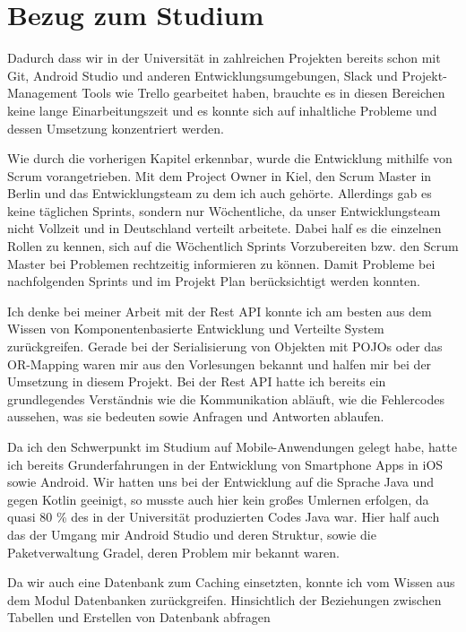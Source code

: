 \chapter{Bezug zum Studium}
Dadurch dass wir in der Universität in zahlreichen Projekten bereits schon mit Git, Android Studio und anderen Entwicklungsumgebungen, Slack und Projekt-Management Tools wie Trello gearbeitet haben, brauchte es in diesen Bereichen keine lange Einarbeitungszeit und es konnte sich auf inhaltliche Probleme und dessen Umsetzung konzentriert werden.

Wie durch die vorherigen Kapitel erkennbar, wurde die Entwicklung mithilfe von Scrum vorangetrieben. Mit dem Project Owner in Kiel, den Scrum Master in Berlin und das Entwicklungsteam zu dem ich auch gehörte. Allerdings gab es keine täglichen Sprints, sondern nur Wöchentliche, da unser Entwicklungsteam nicht Vollzeit und in Deutschland verteilt arbeitete. Dabei half es die einzelnen Rollen zu kennen, sich auf die Wöchentlich Sprints Vorzubereiten bzw. den Scrum Master bei Problemen rechtzeitig informieren zu können. Damit Probleme bei nachfolgenden Sprints und im Projekt Plan berücksichtigt werden konnten.  %


Ich denke bei meiner Arbeit mit der Rest API konnte ich am besten aus dem Wissen von Komponentenbasierte Entwicklung und Verteilte System zurückgreifen. Gerade bei der Serialisierung von Objekten mit POJOs oder das OR-Mapping waren mir aus den Vorlesungen bekannt und halfen mir bei der Umsetzung in diesem Projekt. Bei der Rest API hatte ich bereits ein grundlegendes Verständnis wie die Kommunikation abläuft, wie die Fehlercodes aussehen, was sie bedeuten sowie Anfragen und Antworten ablaufen.

Da ich den Schwerpunkt im Studium  auf Mobile-Anwendungen gelegt habe, hatte ich bereits Grunderfahrungen in der Entwicklung von Smartphone Apps in iOS sowie  Android. Wir hatten uns bei der Entwicklung auf die Sprache Java und gegen Kotlin geeinigt, so musste auch hier kein großes Umlernen erfolgen, da quasi 80 \% des in der Universität produzierten Codes Java war. Hier half auch das der Umgang mir Android Studio und deren Struktur, sowie die Paketverwaltung Gradel, deren Problem mir bekannt waren.

Da wir auch eine Datenbank zum Caching einsetzten, konnte ich vom Wissen aus dem Modul Datenbanken zurückgreifen. Hinsichtlich der Beziehungen zwischen Tabellen und Erstellen von Datenbank abfragen

